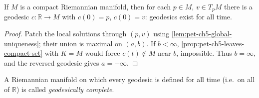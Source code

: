 \begin{corollary}
  \label{cor:pet-ch5-compact-manifold-complete}


  If $M$ is a compact Riemannian manifold, then for each $p\in M$, $v\in T_pM$
  there is a geodesic $c:\mathbb R\to M$ with $c(0)=p$, $\dot c(0)=v$: geodesics exist
  for all time.
\end{corollary}
\begin{proof}
  \sketch
  Patch the local solutions through $(p,v)$ using
  \cref{lem:pet-ch5-global-uniqueness}; their union is maximal on $(a,b)$.
  If $b<\infty$, \cref{prop:pet-ch5-leaves-compact-set} with $K=M$ would force
  $c(t)\notin M$ near $b$, impossible.  Thus $b=\infty$, and the reversed
  geodesic gives $a=-\infty$.
\end{proof}

\begin{definition}
  \label{def:pet-ch5-geodesically-complete}


  A Riemannian manifold on which every geodesic is defined for all time (i.e.\ on
  all of $\mathbb R$) is called \emph{geodesically complete}.
\end{definition}

